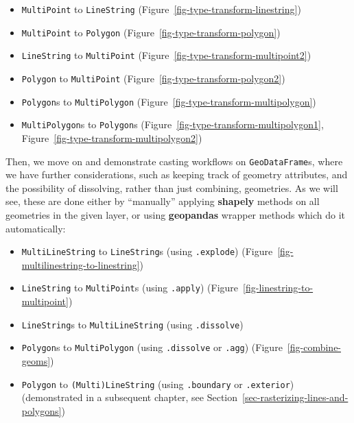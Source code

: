 \documentclass[
  letterpaper,
]{krantz}
\providecommand{\tightlist}{%
  \setlength{\itemsep}{0pt}\setlength{\parskip}{0pt}}\usepackage{longtable,booktabs,array}
\begin{document}
\begin{itemize}
\tightlist
\item
  \texttt{\textquotesingle{}MultiPoint\textquotesingle{}} to
  \texttt{\textquotesingle{}LineString\textquotesingle{}}
  (Figure~\ref{fig-type-transform-linestring})
\item
  \texttt{\textquotesingle{}MultiPoint\textquotesingle{}} to
  \texttt{\textquotesingle{}Polygon\textquotesingle{}}
  (Figure~\ref{fig-type-transform-polygon})
\item
  \texttt{\textquotesingle{}LineString\textquotesingle{}} to
  \texttt{\textquotesingle{}MultiPoint\textquotesingle{}}
  (Figure~\ref{fig-type-transform-multipoint2})
\item
  \texttt{\textquotesingle{}Polygon\textquotesingle{}} to
  \texttt{\textquotesingle{}MultiPoint\textquotesingle{}}
  (Figure~\ref{fig-type-transform-polygon2})
\item
  \texttt{\textquotesingle{}Polygon\textquotesingle{}}s to
  \texttt{\textquotesingle{}MultiPolygon\textquotesingle{}}
  (Figure~\ref{fig-type-transform-multipolygon})
\item
  \texttt{\textquotesingle{}MultiPolygon\textquotesingle{}}s to
  \texttt{\textquotesingle{}Polygon\textquotesingle{}}s
  (Figure~\ref{fig-type-transform-multipolygon1},
  Figure~\ref{fig-type-transform-multipolygon2})
\end{itemize}

Then, we move on and demonstrate casting workflows on
\texttt{GeoDataFrame}s, where we have further considerations, such as
keeping track of geometry attributes, and the possibility of dissolving,
rather than just combining, geometries. As we will see, these are done
either by ``manually'' applying \textbf{shapely} methods on all
geometries in the given layer, or using \textbf{geopandas} wrapper
methods which do it automatically:

\begin{itemize}
\tightlist
\item
  \texttt{\textquotesingle{}MultiLineString\textquotesingle{}} to
  \texttt{\textquotesingle{}LineString\textquotesingle{}}s (using
  \texttt{.explode}) (Figure~\ref{fig-multilinestring-to-linestring})
\item
  \texttt{\textquotesingle{}LineString\textquotesingle{}} to
  \texttt{\textquotesingle{}MultiPoint\textquotesingle{}}s (using
  \texttt{.apply}) (Figure~\ref{fig-linestring-to-multipoint})
\item
  \texttt{\textquotesingle{}LineString\textquotesingle{}}s to
  \texttt{\textquotesingle{}MultiLineString\textquotesingle{}} (using
  \texttt{.dissolve})
\item
  \texttt{\textquotesingle{}Polygon\textquotesingle{}}s to
  \texttt{\textquotesingle{}MultiPolygon\textquotesingle{}} (using
  \texttt{.dissolve} or \texttt{.agg}) (Figure~\ref{fig-combine-geoms})
\item
  \texttt{\textquotesingle{}Polygon\textquotesingle{}} to
  \texttt{\textquotesingle{}(Multi)LineString\textquotesingle{}} (using
  \texttt{.boundary} or \texttt{.exterior}) (demonstrated in a
  subsequent chapter, see
  Section~\ref{sec-rasterizing-lines-and-polygons})
\end{itemize}
\end{document}
